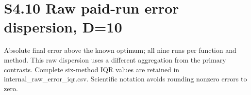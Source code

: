 \documentclass[11pt,a4paper]{article}
\begin{document}
\newpage

\hypertarget{s4.10-raw-paid-run-error-dispersion-d10}{%
\section{S4.10 Raw paid-run error dispersion,
D=10}\label{s4.10-raw-paid-run-error-dispersion-d10}}

Absolute final error above the known optimum; all nine runs per function
and method. This raw dispersion uses a different aggregation from the
primary contrasts. Complete six-method IQR values are retained in
internal\_raw\_error\_iqr.csv. Scientific notation avoids rounding
nonzero errors to zero.

\par\noindent\begin{minipage}{\linewidth}


\end{minipage}
\end{document}
